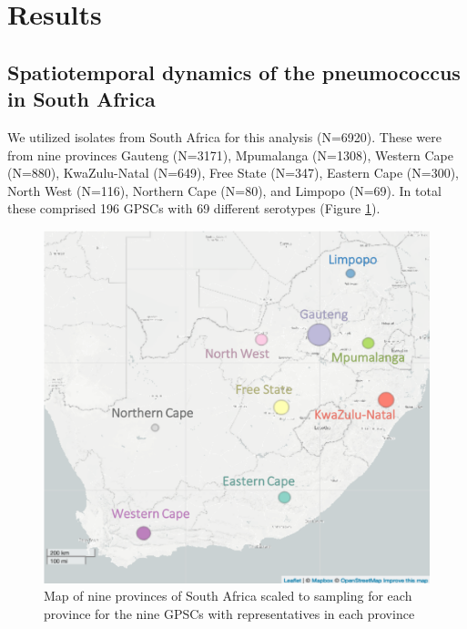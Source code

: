 \documentclass{article}
\begin{document}
\section{Results}
\subsection{Spatiotemporal dynamics of the pneumococcus in South Africa}
We utilized isolates from South Africa for this analysis (N=6920). These were from nine provinces Gauteng (N=3171), Mpumalanga (N=1308), Western Cape (N=880), KwaZulu-Natal (N=649), Free State (N=347), Eastern Cape (N=300), North West (N=116), Northern Cape (N=80), and Limpopo (N=69). In total these comprised 196 GPSCs with 69 different serotypes (Figure \ref{fig:map}). 
\begin{figure}[H]
\centering
    \includegraphics[width=\textwidth]{scaledmap.png}
    \caption{Map of nine provinces of South Africa scaled to sampling for each province for the nine GPSCs with representatives in each province}
    \label{fig:map}
\end{figure}
\end{document}

